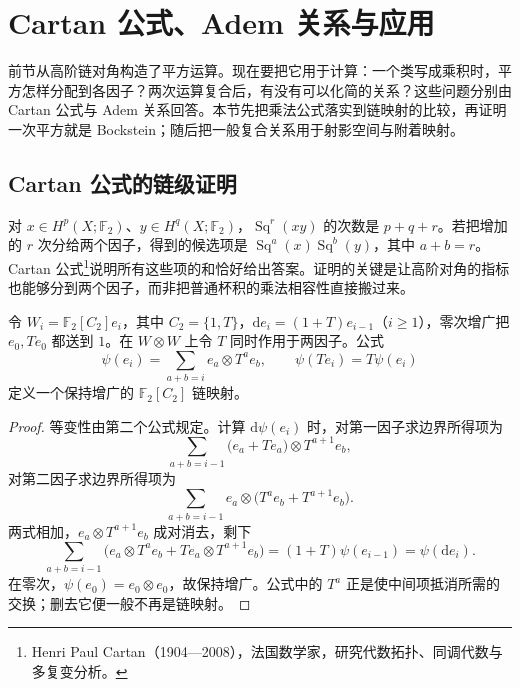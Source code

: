 
% 
% 

\section{Cartan 公式、Adem 关系与应用}
\label{g2:sec:1303}

前节从高阶链对角构造了平方运算。现在要把它用于计算：一个类写成乘积时，平方怎样分配到各因子？两次运算复合后，有没有可以化简的关系？这些问题分别由 Cartan 公式与 Adem 关系回答。本节先把乘法公式落实到链映射的比较，再证明一次平方就是 Bockstein；随后把一般复合关系用于射影空间与附着映射。

\subsection{Cartan 公式的链级证明}
\label{g2:subsec:1303:01}

对 \(x\in H^p(X;\mathbb F_2)\)、\(y\in H^q(X;\mathbb F_2)\)，\(\operatorname{Sq}^r(xy)\) 的次数是 \(p+q+r\)。若把增加的 \(r\) 次分给两个因子，得到的候选项是 \(\operatorname{Sq}^a(x)\operatorname{Sq}^b(y)\)，其中 \(a+b=r\)。Cartan 公式\footnote{Henri Paul Cartan（1904—2008），法国数学家，研究代数拓扑、同调代数与多复变分析。}说明所有这些项的和恰好给出答案。证明的关键是让高阶对角的指标也能够分到两个因子，而非把普通杯积的乘法相容性直接搬过来。

\begin{lemma}\label{g2:lem:steenrod-resolution-diagonal}
	令 \(W_i=\mathbb F_2[C_2]e_i\)，其中 \(C_2=\{1,T\}\)，\(\mathrm d e_i=(1+T)e_{i-1}\)（\(i\ge1\)），零次增广把 \(e_0,Te_0\) 都送到 \(1\)。在 \(W\otimes W\) 上令 \(T\) 同时作用于两因子。公式
	\begin{equation}\label{g2:eq:steenrod-resolution-diagonal}
		\psi(e_i)=\sum_{a+b=i}e_a\otimes T^a e_b,
		\qquad \psi(Te_i)=T\psi(e_i)
	\end{equation}
	定义一个保持增广的 \(\mathbb F_2[C_2]\) 链映射。
\end{lemma}
\begin{proof}
	等变性由第二个公式规定。计算 \(\mathrm d\psi(e_i)\) 时，对第一因子求边界所得项为
	\[
		\sum_{a+b=i-1}\bigl(e_a+Te_a\bigr)\otimes T^{a+1}e_b,
	\]
	对第二因子求边界所得项为
	\[
		\sum_{a+b=i-1}e_a\otimes\bigl(T^a e_b+T^{a+1}e_b\bigr).
	\]
	两式相加，\(e_a\otimes T^{a+1}e_b\) 成对消去，剩下
	\[
		\sum_{a+b=i-1}\bigl(e_a\otimes T^a e_b+Te_a\otimes T^{a+1}e_b\bigr)
		=(1+T)\psi(e_{i-1})=\psi(\mathrm d e_i).
	\]
	在零次，\(\psi(e_0)=e_0\otimes e_0\)，故保持增广。公式中的 \(T^a\) 正是使中间项抵消所需的交换；删去它便一般不再是链映射。
\end{proof}

